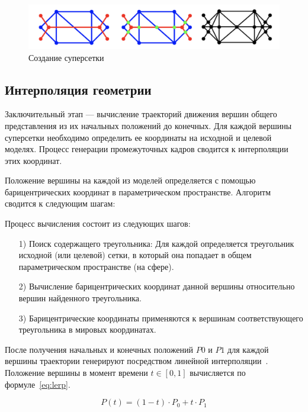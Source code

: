    	\begin{figure}[H]
	   	\centering
	   	\includegraphics[width=\textwidth]{../inc/images/supermesh}
	   	\caption{Создание суперсетки}
	   	\label{fig:supermesh}
    \end{figure}

    \subsection{Интерполяция геометрии}
    Заключительный этап --- вычисление траекторий движения вершин общего представления из их начальных положений до конечных. Для каждой вершины суперсетки необходимо определить ее координаты на исходной и целевой моделях. Процесс генерации промежуточных кадров сводится к интерполяции этих координат.

	Положение вершины на каждой из моделей определяется с помощью барицентрических координат в параметрическом пространстве\cite{mocanu,alexa}. Алгоритм сводится к следующим шагам:
    
    Процесс вычисления состоит из следующих шагов:
    \begin{enumerate}
        \item[1)] Поиск содержащего треугольника: Для каждой определяется треугольник исходной (или целевой) сетки, в который она попадает в общем параметрическом пространстве (на сфере).
        \item[2)] Вычисление барицентрических координат данной вершины относительно вершин найденного треугольника.
        \item[3)] Барицентрические координаты применяются к вершинам соответствующего треугольника в мировых координатах.
    \end{enumerate}

	После получения начальных и конечных положений $P0$ и $P1$ для каждой вершины траектории генерируют посредством линейной интерполяции~\cite{mocanu,alexa}. Положение вершины в момент времени $t\in [0,1]$ вычисляется по формуле~\eqref{eq:lerp}.

    \begin{equation}
    	\label{eq:lerp}
        P(t) = (1 - t) \cdot P_0 + t \cdot P_1
    \end{equation}

